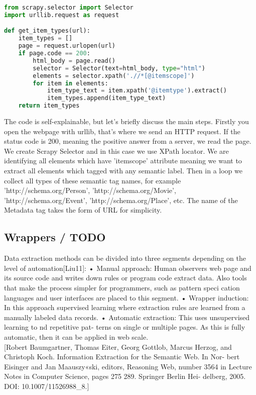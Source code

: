 \begin{lstlisting}[language=Python, caption={Example of meta tag text scrapping with Scrapy Python framework}, label={img:scrapy}, captionpos=b]
from scrapy.selector import Selector
import urllib.request as request

def get_item_types(url):
    item_types = []
    page = request.urlopen(url)
    if page.code == 200:
        html_body = page.read()
        selector = Selector(text=html_body, type="html")
        elements = selector.xpath('.//*[@itemscope]')
        for item in elements:
            item_type_text = item.xpath('@itemtype').extract()
            item_types.append(item_type_text)
    return item_types 
\end{lstlisting}
The code is self-explainable, but let's briefly discuss the main steps. Firstly you open the webpage with urllib, that's where we send an HTTP request. If the status code is 200, meaning the positive answer from a server, we read the page. We create Scrapy Selector and in this case we use XPath locator. We are identifying all elements which have 'itemscope' attribute meaning we want to extract all elements which tagged with any semantic label. Then in a loop we collect all types of these semantic tag names, for example 'http://schema.org/Person', 'http://schema.org/Movie', 'http://schema.org/Event', 'http://schema.org/Place', etc. The name of the Metadata tag takes the form of URL for simplicity. 

\subsection{Wrappers / TODO}
Data extraction methods can be divided into three segments depending on the level of automation[Liu11]:
• Manual approach: Human observers web page and its source code and writes down rules or program code extract data. Also tools that make the process simpler for programmers, such as pattern speci cation languages and user interfaces are placed to this segment.
• Wrapper induction: In this approach supervised learning where extraction rules are learned from a manually labeled data records.
• Automatic extraction: This uses unsupervised learning to  nd repetitive pat- terns on single or multiple pages. As this is fully automatic, then it can be applied in web scale.\\

[Robert Baumgartner, Thomas Eiter, Georg Gottlob, Marcus Herzog, and Christoph Koch. Information Extraction for the Semantic Web. In Nor- bert Eisinger and Jan Maauszy«ski, editors, Reasoning Web, number 3564 in Lecture Notes in Computer Science, pages 275 289. Springer Berlin Hei- delberg, 2005. DOI: 10.1007/11526988\_8.]



